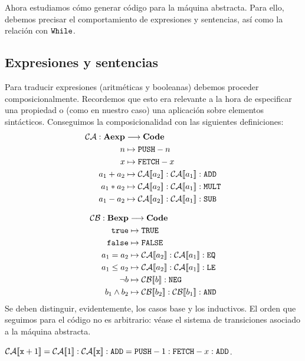 Ahora estudiamos cómo generar código para la máquina abstracta. Para ello, debemos precisar el comportamiento de expresiones y sentencias, así como la relación con $\texttt{While}$.

\subsection{Expresiones y sentencias}

Para traducir expresiones (aritméticas y booleanas) debemos proceder composicionalmente. Recordemos que esto era relevante a la hora de especificar una propiedad o (como en nuestro caso) una aplicación sobre elementos sintácticos. Conseguimos la composicionalidad con las siguientes definiciones:
\begin{align*}
    \mc{CA}: \mathbf{Aexp} &\longrightarrow\mathbf{Code}\\
    n &\mapsto \n{PUSH}-n\\
    x &\mapsto \n{FETCH}-x\\
    a_1 + a_2&\mapsto \fc{CA}{a_2}:\fc{CA}{a_1}: \n{ADD}\\
    a_1 * a_2&\mapsto \fc{CA}{a_2}:\fc{CA}{a_1}: \n{MULT}\\
    a_1 - a_2&\mapsto \fc{CA}{a_2}:\fc{CA}{a_1}: \n{SUB}
\end{align*}

\begin{align*}
    \mc{CB}: \mathbf{Bexp} &\longrightarrow\mathbf{Code}\\
    \n{true} &\mapsto \n{TRUE}\\
    \n{false} &\mapsto \n{FALSE}\\
    a_1 = a_2&\mapsto \fc{CA}{a_2}:\fc{CA}{a_1}: \n{EQ}\\
    a_1 \leq a_2&\mapsto \fc{CA}{a_2}:\fc{CA}{a_1}: \n{LE}\\
    \neg b&\mapsto \fc{CB}{b}:\n{NEG}\\
    b_1 \land b_2&\mapsto \fc{CB}{b_2}:\fc{CB}{b_1}: \n{AND}
\end{align*}
Se deben distinguir, evidentemente, los casos base y los inductivos. El orden que seguimos para el código no es arbitrario: véase el sistema de transiciones asociado a la máquina abstracta. 
\\

\begin{example}
$\mathcal{CA}[\![\texttt{x}+1]\!]= \mathcal{CA}[\![1]\!]:\mathcal{CA}[\![\texttt{x}]\!]:\texttt{ADD} = \texttt{PUSH}-1:\texttt{FETCH}-x:\texttt{ADD}$.
\\

\end{example}

